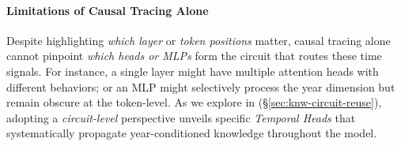 \paragraph{Limitations of Causal Tracing Alone}
Despite highlighting \emph{which layer} or \emph{token positions} matter, causal tracing alone cannot pinpoint \emph{which heads or MLPs} form the circuit that routes these time signals. 
For instance, a single layer might have multiple attention heads with different behaviors; or an MLP might selectively process the year dimension but remain obscure at the token-level. 
As we explore in (\S\ref{sec:knw-circuit-reuse}), adopting a \emph{circuit-level} perspective unveils specific \emph{Temporal Heads} that systematically propagate year-conditioned knowledge throughout the model. 
